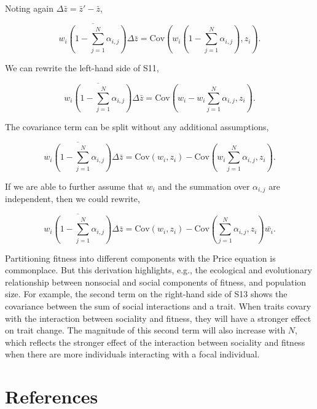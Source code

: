 \documentclass[
]{article}
\begin{document}
Noting again \(\Delta \bar{z} = \bar{z}' - \bar{z}\),

\[\overline{w_{i}\left(1 - \sum_{j=1}^{N}\alpha_{i, j}\right)}\Delta\bar{z} = \mathrm{Cov}\left(w_{i}\left(1 - \sum_{j=1}^{N}\alpha_{i, j}\right), z_{i}  \right). 
\tag{S11}
\]

We can rewrite the left-hand side of S11,

\[\overline{w_{i}\left(1 - \sum_{j=1}^{N}\alpha_{i, j}\right)}\Delta\bar{z} = \mathrm{Cov}\left(w_{i} - w_{i}\sum_{j=1}^{N}\alpha_{i, j}, z_{i}  \right). 
\tag{S12}
\]

The covariance term can be split without any additional assumptions,

\[\overline{w_{i}\left(1 - \sum_{j=1}^{N}\alpha_{i, j}\right)}\Delta\bar{z} = \mathrm{Cov}\left(w_{i}, z_{i}  \right) - \mathrm{Cov}\left(w_{i}\sum_{j=1}^{N}\alpha_{i, j}, z_{i}  \right). 
\tag{S13}
\]

If we are able to further assume that \(w_{i}\) and the summation over
\(\alpha_{i,j}\) are independent, then we could rewrite,

\[\overline{w_{i}\left(1 - \sum_{j=1}^{N}\alpha_{i, j}\right)}\Delta\bar{z} = \mathrm{Cov}\left(w_{i}, z_{i}  \right) - \mathrm{Cov}\left(\sum_{j=1}^{N}\alpha_{i, j}, z_{i}  \right)\bar{w_{i}}. 
\tag{S14}
\]

Partitioning fitness into different components with the Price equation
is commonplace. But this derivation highlights, e.g., the ecological and
evolutionary relationship between nonsocial and social components of
fitness, and population size. For example, the second term on the
right-hand side of S13 shows the covariance between the sum of social
interactions and a trait. When traits covary with the interaction
between sociality and fitness, they will have a stronger effect on trait
change. The magnitude of this second term will also increase with \(N\),
which reflects the stronger effect of the interaction between sociality
and fitness when there are more individuals interacting with a focal
individual.

\section*{References}\label{references}
\end{document}
